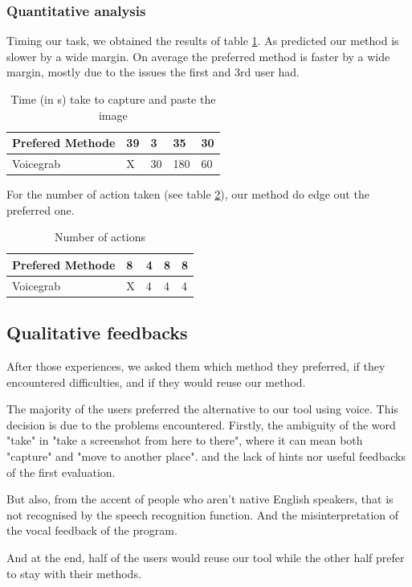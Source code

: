 \subsubsection*{Quantitative analysis}
Timing our task, we obtained the results of table \ref{table:time}. As predicted our method is slower by a wide margin. On average the preferred method is faster by a wide margin, mostly due to the issues the first and 3rd user had.
\begin{table}[H]
    \centering
    \begin{tabular}{l|l|l|l|l}
    Prefered Methode & 39  & 3  & 35  & 30 \\ \hline
    Voicegrab        & X & 30 & 180 & 60
    \end{tabular}
    \caption{Time (in s) take to capture and paste the image}
    \label{table:time}
\end{table}

For the number of action taken (see table \ref{table:actions}), our method do edge out the preferred one.
\begin{table}[H]
    \centering
    \begin{tabular}{l|l|l|l|l}
    Prefered Methode & 8 & 4 & 8 & 8 \\ \hline
    Voicegrab        & X & 4 & 4 & 4
    \end{tabular}
    \caption{Number of actions}
    \label{table:actions}
\end{table}


\subsection{Qualitative feedbacks}
After those experiences, we asked them which method they preferred, if they encountered difficulties, and if they would reuse our method.

The majority of the users preferred the alternative to our tool using voice.
This decision is due to the problems encountered. Firstly, the ambiguity of the word "take" in "take a screenshot from here to there", where it can mean both "capture" and "move to another place". and the lack of hints nor useful feedbacks of the first evaluation.

But also, from the accent of people who aren't native English speakers, that is not recognised by the speech recognition function. And the misinterpretation of the vocal feedback of the program.

And at the end, half of the users would reuse our tool while the other half prefer to stay with their methods.

